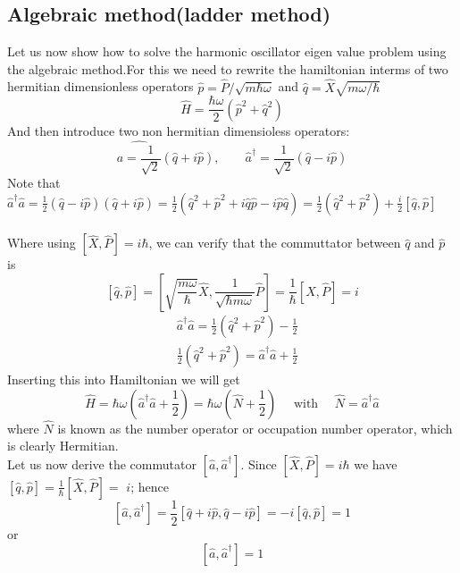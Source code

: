 \subsection{Algebraic method(ladder method)}
   Let us now show how to solve the harmonic oscillator eigen value problem using the algebraic method.For this we need to rewrite the hamiltonian interms of two hermitian dimensionless operators $\hat{p}=\hat{P}/\sqrt{m\hbar \omega}$ and $\hat{q}=\hat{X}\sqrt{m\omega/\hbar}$\\
   $$\hat{H}=\frac{\hbar \omega}{2}\left( \hat{p}^2+\hat{q}^2\right) $$
   And then introduce two non hermitian dimensioless operators:
   $$\hat{a=\frac{1}{\sqrt{2}}}(\hat{q}+i\hat{p}), \quad \quad \hat{a}^{\dagger}=\frac{1}{\sqrt{2}}(\hat{q}-i\hat{p})$$
   Note that $\hat{a}^{\dagger}\hat{a}=\frac{1}{2}(\hat{q}-i\hat{p})(\hat{q}+i\hat{p})=\frac{1}{2}\left( \hat{q}^2+\hat{p}^2+i\hat{q}\hat{p}-i\hat{p}\hat{q}\right) =\frac{1}{2}(\hat{q}^2+\hat{p}^2)+\frac{i}{2} \left[ \hat{q},\hat{p}\right] $\\\\
   Where using $ \left[ \hat{X}, \hat{P} \right] =i\hbar$, we can verify that the commuttator between $\hat{q}$ and $\hat{p}$ is \\
   $$\left[ \hat{q}, \hat{p}\right] =\left[ \sqrt{\frac{m\omega}{\hbar}}\hat{X},\frac{1}{\sqrt{\hbar m\omega}}\hat{P}\right]=\frac{1}{\hbar}\left[ \hat{X},\hat{P}\right] =i$$
   $$\begin{aligned}
   	&\hat{a}^{\dagger} \hat{a}=\frac{1}{2}\left(\hat{q}^{2}+\hat{p}^{2}\right)-\frac{1}{2} \\
   	&\frac{1}{2}\left(\hat{q}^{2}+\hat{p}^{2}\right)=\hat{a}^{\dagger} \hat{a}+\frac{1}{2}
   \end{aligned}$$
   Inserting this into Hamiltonian we will get \\
   $$\hat{H}=\hbar \omega\left(\hat{a}^{\dagger} \hat{a}+\frac{1}{2}\right)=\hbar \omega\left(\hat{N}+\frac{1}{2}\right) \quad \text { with } \quad \hat{N}=\hat{a}^{\dagger} \hat{a}$$
   where $\hat{N}$ is known as the number operator or occupation number operator, which is clearly Hermitian.\\
   Let us now derive the commutator $\left[\hat{a}, \hat{a}^{\dagger}\right]$. Since $[\hat{X}, \hat{P}]=i \hbar$ we have $[\hat{q}, \hat{p}]=\frac{1}{\hbar}[\hat{X}, \hat{P}]=$ $i$; hence
   $$
   \left[\hat{a}, \hat{a}^{\dagger}\right]=\frac{1}{2}[\hat{q}+i \hat{p}, \hat{q}-i \hat{p}]=-i[\hat{q}, \hat{p}]=1
   $$
   or $$ \left[\hat{a}, \hat{a}^{\dagger}\right]=1$$
